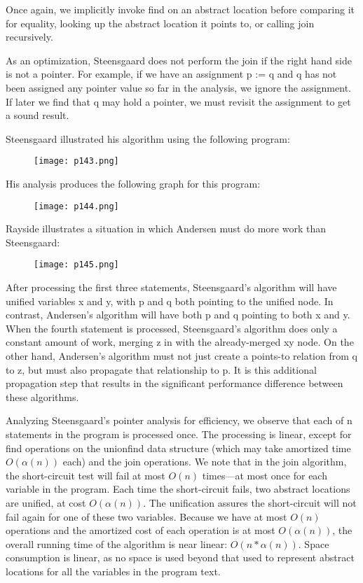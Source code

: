 Once again, we implicitly invoke find on an abstract location before comparing it for equality,
looking up the abstract location it points to, or calling join recursively.


As an optimization, Steensgaard does not perform the join if the right hand side is not a pointer.
For example, if we have an assignment p := q and q has not been assigned any pointer value so
far in the analysis, we ignore the assignment. If later we find that q may hold a pointer, we must
revisit the assignment to get a sound result.

Steensgaard illustrated his algorithm using the following program:


\begin{figure}[H]
	\centering
	\texttt{[image: p143.png]}
	\caption{}
	\label{fig:p143}
\end{figure}

His analysis produces the following graph for this program:

\begin{figure}[H]
	\centering
	\texttt{[image: p144.png]}
	\caption{}
	\label{fig:p144}
\end{figure}

Rayside illustrates a situation in which Andersen must do more work than Steensgaard:


\begin{figure}[H]
	\centering
	\texttt{[image: p145.png]}
	\caption{}
	\label{fig:p145}
\end{figure}

After processing the first three statements, Steensgaard’s algorithm will have unified variables
x and y, with p and q both pointing to the unified node. In contrast, Andersen’s algorithm will
have both p and q pointing to both x and y. When the fourth statement is processed, Steensgaard’s
algorithm does only a constant amount of work, merging z in with the already-merged xy node.
On the other hand, Andersen’s algorithm must not just create a points-to relation from q to z, but
must also propagate that relationship to p. It is this additional propagation step that results in the
significant performance difference between these algorithms.


Analyzing Steensgaard’s pointer analysis for efficiency, we observe that each of n statements
in the program is processed once. The processing is linear, except for find operations on the unionfind data structure (which may take amortized time $O(\alpha(n))$ each) and the join operations. We
note that in the join algorithm, the short-circuit test will fail at most $O(n)$ times—at most once for
each variable in the program. Each time the short-circuit fails, two abstract locations are unified,
at cost $O(\alpha(n))$. The unification assures the short-circuit will not fail again for one of these two
variables. Because we have at most $O(n)$ operations and the amortized cost of each operation
is at most $O(\alpha(n))$, the overall running time of the algorithm is near linear: $O(n * \alpha(n))$. Space
consumption is linear, as no space is used beyond that used to represent abstract locations for all
the variables in the program text.


